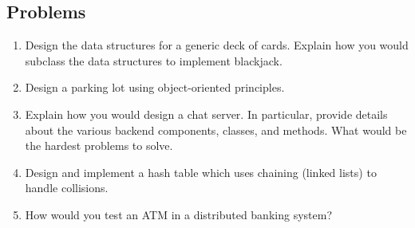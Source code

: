 \documentclass{article}
\begin{document}
	\subsection{Problems}
		\begin{enumerate}
			\item Design the data structures for a generic deck of cards. Explain how you would subclass the data structures to implement blackjack.
			\item Design a parking lot using object-oriented principles.
			\item Explain how you would design a chat server. In particular, provide details about the various backend components, classes, and methods. What would be the hardest problems to solve.
			\item Design and implement a hash table which uses chaining (linked lists) to handle collisions.
			\item How would you test an ATM in a distributed banking system?
		\end{enumerate}

%
%
%
\end{document}
